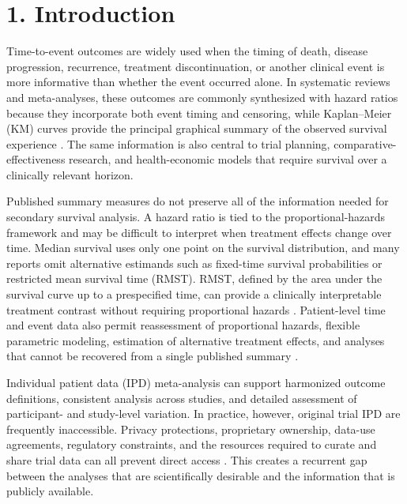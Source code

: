 \documentclass[10pt,letterpaper]{article}
\begin{document}
\linenumbers

\section*{1. Introduction}

Time-to-event outcomes are widely used when the timing of death, disease progression, recurrence, treatment discontinuation, or another clinical event is more informative than whether the event occurred alone. In systematic reviews and meta-analyses, these outcomes are commonly synthesized with hazard ratios because they incorporate both event timing and censoring, while Kaplan--Meier (KM) curves provide the principal graphical summary of the observed survival experience \cite{tierney2007}. The same information is also central to trial planning, comparative-effectiveness research, and health-economic models that require survival over a clinically relevant horizon.

Published summary measures do not preserve all of the information needed for secondary survival analysis. A hazard ratio is tied to the proportional-hazards framework and may be difficult to interpret when treatment effects change over time. Median survival uses only one point on the survival distribution, and many reports omit alternative estimands such as fixed-time survival probabilities or restricted mean survival time (RMST). RMST, defined by the area under the survival curve up to a prespecified time, can provide a clinically interpretable treatment contrast without requiring proportional hazards \cite{royston2013}. Patient-level time and event data also permit reassessment of proportional hazards, flexible parametric modeling, estimation of alternative treatment effects, and analyses that cannot be recovered from a single published summary \cite{guyot2012,wei2017}.

Individual patient data (IPD) meta-analysis can support harmonized outcome definitions, consistent analysis across studies, and detailed assessment of participant- and study-level variation. In practice, however, original trial IPD are frequently inaccessible. Privacy protections, proprietary ownership, data-use agreements, regulatory constraints, and the resources required to curate and share trial data can all prevent direct access \cite{liu2021,kim2025}. This creates a recurrent gap between the analyses that are scientifically desirable and the information that is publicly available.
\end{document}

